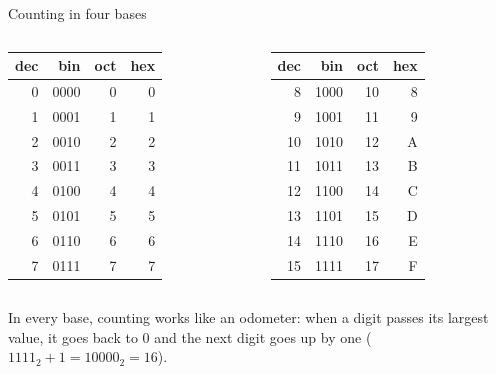 \documentclass[10pt]{wosm-slides}
\newcommand*\base[2]{\ensuremath{\mathrm{#1}_{#2}}}
\begin{document}
\begin{frame}{Counting in four bases}
  \small
  \begin{columns}[T, totalwidth=\textwidth]
      \centering
      \begin{tabular}{@{}rrrr@{}}
        \toprule
        dec & bin & oct & hex \\
        \midrule
        0 & 0000 & 0 & 0 \\
        1 & 0001 & 1 & 1 \\
        2 & 0010 & 2 & 2 \\
        3 & 0011 & 3 & 3 \\
        4 & 0100 & 4 & 4 \\
        5 & 0101 & 5 & 5 \\
        6 & 0110 & 6 & 6 \\
        7 & 0111 & 7 & 7 \\
        \bottomrule
      \end{tabular}
      \centering
      \begin{tabular}{@{}rrrr@{}}
        \toprule
        dec & bin & oct & hex \\
        \midrule
        8 & 1000 & 10 & 8 \\
        9 & 1001 & 11 & 9 \\
        10 & 1010 & 12 & A \\
        11 & 1011 & 13 & B \\
        12 & 1100 & 14 & C \\
        13 & 1101 & 15 & D \\
        14 & 1110 & 16 & E \\
        15 & 1111 & 17 & F \\
        \bottomrule
      \end{tabular}
  \end{columns}

  \medskip
  \normalsize
  In every base, counting works like an odometer: when a digit passes its largest
  value, it goes back to 0 and the next digit goes up by one ($\base{1111}{2} + 1 =
  \base{10000}{2} = 16$).
\end{frame}
\end{document}
